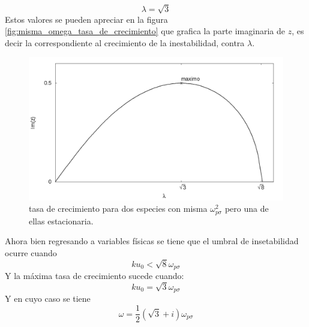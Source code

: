 \documentclass[12pt]{article}
\begin{document}
\begin{equation}
\lambda = \sqrt{3}
\end{equation}
Estos valores se pueden apreciar en la figura \ref{fig:misma_omega_tasa_de_crecimiento} que grafica la parte imaginaria de $z$, es decir la correspondiente al crecimiento de la inestabilidad, contra $\lambda$. 
\begin{figure}[!h]
\includegraphics[height=0.3\paperheight]{grafica_misma_omega_reposo.png}
\caption{tasa de crecimiento para dos especies con misma $\omega_{p\sigma}^2$ pero una de ellas estacionaria.}
\label{fig:misma_omega_reposo}
\end{figure}
Ahora bien regresando a variables físicas se tiene que el umbral de insetabilidad ocurre cuando
\begin{equation}
ku_0 < \sqrt{8} \omega_{p\sigma}
\end{equation}
Y la máxima tasa de crecimiento sucede cuando:
\begin{equation}
ku_0= \sqrt{3} \omega_{p\sigma}
\end{equation}
Y en cuyo caso se tiene
\begin{equation}
\omega = \frac{1}{2} (\sqrt{3} + i)\omega_{p\sigma}
\end{equation}
\end{document}
